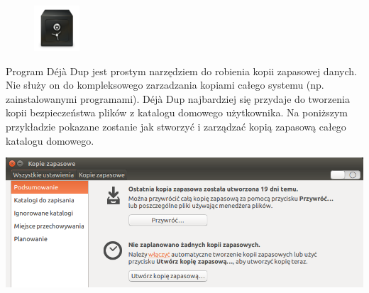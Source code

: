 \begin{figure}
	\vspace{-10pt}
	\includegraphics[width=\linewidth]{images/ikony_deja-dup.png}
\end{figure}

Program \textcolor{ubuntu_orange}{Déjà Dup} jest prostym narzędziem do robienia kopii zapasowej danych. Nie służy on do kompleksowego zarzadzania kopiami całego systemu (np. zainstalowanymi programami). Déjà Dup najbardziej się przydaje do tworzenia kopii bezpieczeństwa plików z katalogu domowego użytkownika. Na poniższym przykładzie pokazane zostanie jak stworzyć i zarządzać kopią zapasową całego katalogu domowego.

\begin{center}
	\includegraphics[width=\linewidth]{images/programy_dejavu1.png}
\end{center}

